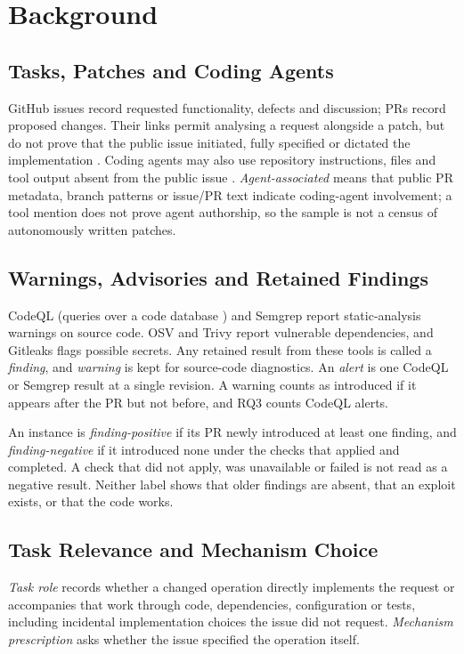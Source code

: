 \documentclass[acmsmall,screen,nonacm]{acmart}
\begin{document}
\section{Background}

\subsection{Tasks, Patches and Coding Agents}

GitHub issues record requested functionality, defects and discussion; PRs record proposed changes. Their links permit analysing a request alongside a patch, but do not prove that the public issue initiated, fully specified or dictated the implementation \cite{b5}. Coding agents may also use repository instructions, files and tool output absent from the public issue \cite{b20,b22}. \emph{Agent-associated} means that public PR metadata, branch patterns or issue/PR text indicate coding-agent involvement; a tool mention does not prove agent authorship, so the sample is not a census of autonomously written patches.

\subsection{Warnings, Advisories and Retained Findings}

CodeQL (queries over a code database \cite{b44}) and Semgrep report static-analysis warnings on source code. OSV and Trivy report vulnerable dependencies, and Gitleaks flags possible secrets. Any retained result from these tools is called a \emph{finding}, and \emph{warning} is kept for source-code diagnostics. An \emph{alert} is one CodeQL or Semgrep result at a single revision. A warning counts as introduced if it appears after the PR but not before, and RQ3 counts CodeQL alerts.

An instance is \emph{finding-positive} if its PR newly introduced at least one finding, and \emph{finding-negative} if it introduced none under the checks that applied and completed. A check that did not apply, was unavailable or failed is not read as a negative result. Neither label shows that older findings are absent, that an exploit exists, or that the code works.

\subsection{Task Relevance and Mechanism Choice}

\emph{Task role} records whether a changed operation directly implements the request or accompanies that work through code, dependencies, configuration or tests, including incidental implementation choices the issue did not request. \emph{Mechanism prescription} asks whether the issue specified the operation itself.
\end{document}
